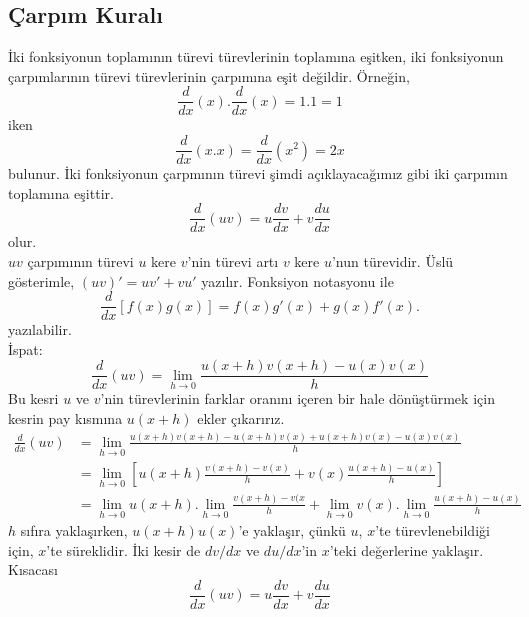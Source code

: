 \subsection{\protect Çarpım Kuralı}
İki fonksiyonun toplamının türevi türevlerinin toplamına eşitken, iki fonksiyonun çarpımlarının türevi türevlerinin çarpımına eşit değildir. Örneğin,
	\begin{equation*}
		\frac{d}{dx}(x).\frac{d}{dx}(x)=1.1=1
	\end{equation*}iken
	\begin{equation*}
		\frac{d}{dx}(x.x)=\frac{d}{dx}(x^2)=2x
	\end{equation*}
bulunur. İki fonksiyonun çarpmının türevi şimdi açıklayacağımız gibi iki çarpımın toplamına eşittir.
	\begin{equation*}
		\frac{d}{dx}(uv)=u\frac{dv}{dx}+v\frac{du}{dx}
	\end{equation*}
olur.\\
$uv$ çarpımının türevi $u$ kere $v$'nin türevi artı $v$ kere $u$'nun türevidir. Üslü gösterimle, $(uv)'=uv'+vu'$ yazılır. Fonksiyon notasyonu ile
	\begin{equation*}
		\frac{d}{dx}[f(x)g(x)]=f(x)g'(x)+g(x)f'(x).
	\end{equation*}
yazılabilir.\\
İspat: \begin{equation*}
		\frac{d}{dx}(uv)=\lim_{h \rightarrow 0} \frac{u(x+h)v(x+h)-u(x)v(x)}{h}
	\end{equation*}
Bu kesri $u$ ve $v$'nin türevlerinin farklar oranını içeren bir hale dönüştürmek için kesrin pay kısmına $u(x+h)$ ekler çıkarırız.
\begin{equation*}
\begin{split}
			\frac{d}{dx}(uv)&=\lim_{h \rightarrow 0}\frac{u(x+h)v(x+h)-u(x+h)v(x)+u(x+h)v(x)-u(x)v(x)}{h}\\
				&=\lim_{h \rightarrow 0}\left[u(x+h)\frac{v(x+h)-v(x)}{h}+v(x)\frac{u(x+h)-u(x)}{h}\right]\\
				&=\lim_{h \rightarrow 0}u(x+h).\lim_{h \rightarrow 0}\frac{v(x+h)-v(x}{h}+\lim_{h \rightarrow 0}v(x).\lim_{h \rightarrow 0}\frac{u(x+h)-u(x)}{h}
\end{split}
\end{equation*}
$h$ sıfıra yaklaşırken, $u(x+h)u(x)$'e yaklaşır, çünkü $u$, $x$'te türevlenebildiği için, $x$'te süreklidir. İki kesir de $dv/dx$ ve $du/dx$'in $x$'teki değerlerine yaklaşır. Kısacası
\begin{equation*}
 	\frac{d}{dx}(uv)= u \frac{dv}{dx} + v \frac{du}{dx}
\end{equation*}
